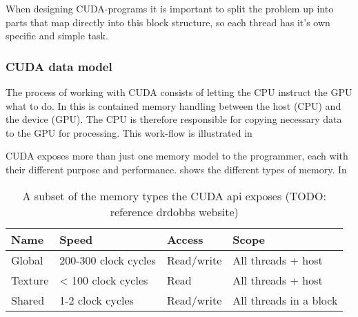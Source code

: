 \newpage
{}

When designing CUDA-programs it is important to split the problem up into parts that map directly into this block structure, so each thread has it's own specific and simple task.


\newpage
\subsubsection{CUDA data model}
The process of working with CUDA consists of letting the CPU instruct the GPU what to do. In this is contained memory handling between the host (CPU) and the device (GPU). The CPU is therefore responsible for copying necessary data to the GPU for processing. This work-flow is illustrated in 


CUDA exposes more than just one memory model to the programmer, each with their different purpose and performance.  shows the different types of memory. In 

\begin{table}[htb]
	\centering
	\begin{tabular}{llll}
		\toprule
		Name 	& Speed & Access & Scope\\
		\midrule
		Global 	& 200-300 clock cycles 	& Read/write & All threads + host \\
		Texture 	& < 100 clock cycles & Read & All threads + host\\
		Shared 	& 1-2 clock cycles & Read/write & All threads in a block\\
		\bottomrule
	\end{tabular}
	\caption{A subset of the memory types the CUDA api exposes (TODO: reference drdobbs website)}
	\label{cudamemtable}
\end{table}


